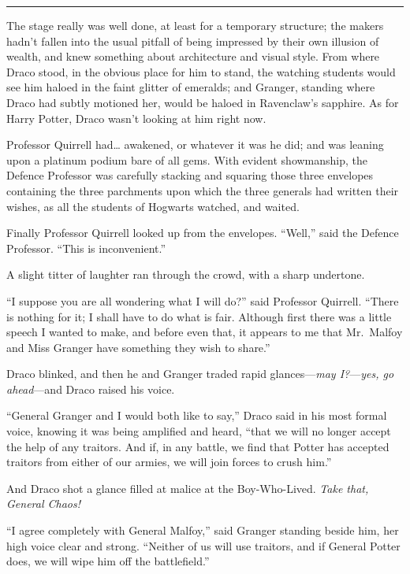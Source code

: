 \begin{center}\rule{3in}{0.4pt}\end{center}

The stage really was well done, at least for a temporary structure; the
makers hadn't fallen into the usual pitfall of being impressed by their
own illusion of wealth, and knew something about architecture and visual
style. From where Draco stood, in the obvious place for him to stand,
the watching students would see him haloed in the faint glitter of
emeralds; and Granger, standing where Draco had subtly motioned her,
would be haloed in Ravenclaw's sapphire. As for Harry Potter, Draco
wasn't looking at him right now.

Professor Quirrell had\ldots{} awakened, or whatever it was he did; and
was leaning upon a platinum podium bare of all gems. With evident
showmanship, the Defence Professor was carefully stacking and squaring
those three envelopes containing the three parchments upon which the
three generals had written their wishes, as all the students of Hogwarts
watched, and waited.

Finally Professor Quirrell looked up from the envelopes. ``Well,'' said
the Defence Professor. ``This is inconvenient.''

A slight titter of laughter ran through the crowd, with a sharp
undertone.

``I suppose you are all wondering what I will do?'' said Professor
Quirrell. ``There is nothing for it; I shall have to do what is fair.
Although first there was a little speech I wanted to make, and before
even that, it appears to me that Mr.~Malfoy and Miss Granger have
something they wish to share.''

Draco blinked, and then he and Granger traded rapid glances---\emph{may
I?}---\emph{yes, go ahead}---and Draco raised his voice.

``General Granger and I would both like to say,'' Draco said in his most
formal voice, knowing it was being amplified and heard, ``that we will
no longer accept the help of any traitors. And if, in any battle, we
find that Potter has accepted traitors from either of our armies, we
will join forces to crush him.''

And Draco shot a glance filled at malice at the Boy-Who-Lived.
\emph{Take that, General Chaos!}

``I agree completely with General Malfoy,'' said Granger standing beside
him, her high voice clear and strong. ``Neither of us will use traitors,
and if General Potter does, we will wipe him off the battlefield.''

